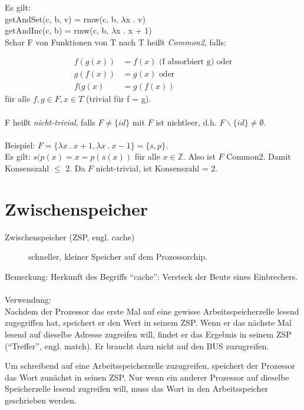 Es gilt: \\
getAndSet(c, b, v) = rmw(c, b, $\lambda$x . v)\\
getAndInc(c, b) = rmw(c, b, $\lambda$x . x + 1)\\

Schar F von Funktionen von T nach T heißt \emph{Common2}, falls:

\begin{align}
	f(g(x)) & = f(x) \text{ (f absorbiert g) oder}\\
	g(f(x)) & = g(x) \text{ oder}\\
	f(g(x) & = g(f(x))	
\end{align}
für alle $f, g \in F, x \in T$ (trivial für f = g).\\
\\
F heißt \emph{nicht-trivial}, falls $ F \neq \{id\} $ mit $ F $ ist nichtleer, d.h. $ F \backslash \{id\} \neq \emptyset $.\\
\\
Beispiel: $ F = \{\lambda x\ .\ x + 1, \lambda x\ .\ x - 1\} = \{s, p\} $.\\
Es gilt: $ s(p(x) = x = p(s(x)) $ für alle $ x \in \mathbb{Z} $. Also ist $ F $ Common2. Damit Konsenszahl $\leq$ 2. Da $ F $ nicht-trivial, ist Konsenszahl = 2. 

\section{Zwischenspeicher}

\begin{description}
	\item[Zwischenspeicher (ZSP, engl. cache)] schneller, kleiner Speicher auf dem Prozessorchip.
\end{description}
Bemerkung: Herkunft des Begriffs "`cache"': Versteck der Beute eines Einbrechers.\\
\\
Verwendung:\\
Nachdem der Prozessor das erste Mal auf eine gewisse Arbeitsspeicherzelle lesend zugegriffen hat, speichert er den Wert in seinem ZSP. Wenn er das nächste Mal lesend auf dieselbe Adresse zugreifen will, findet er das Ergebnis in seinem ZSP ("`Treffer"', engl. match). Er braucht dazu nicht auf den BUS zuzugreifen.

Um schreibend auf eine Arbeitsspeicherzelle zuzugreifen, speichert der Prozessor das Wort zunächst in seinen ZSP. Nur wenn ein anderer Prozessor auf dieselbe Speicherzelle lesend zugreifen will, muss das Wort in den Arbeitsspeicher geschrieben werden.

